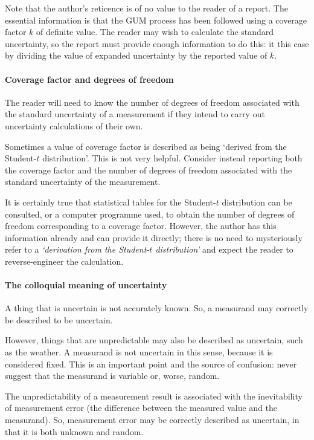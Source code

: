 Note that the author's reticence is of no value to the reader of a report. The essential information is that the GUM process has been followed using a coverage factor $k$ of definite value. The reader may wish to calculate the standard uncertainty, so the report must provide enough information to do this: it this case by dividing the value of expanded uncertainty by the reported value of $k$.

\paragraph{Coverage factor and degrees of freedom}
The reader will need to know the number of degrees of freedom associated with the standard uncertainty of a measurement if they intend to carry out uncertainty calculations of their own. 

Sometimes a value of coverage factor is described as being `derived from the Student-$t$ distribution'. This is not very helpful. Consider instead reporting both the coverage factor and the number of degrees of freedom associated with the standard uncertainty of the measurement.

It is certainly true that statistical tables for the Student-$t$ distribution can be consulted, or a computer programme used, to obtain the number of degrees of freedom corresponding to a coverage factor. However, the author has this information already and can provide it directly; there is no need to mysteriously refer to a \textit{`derivation from the Student-$t$ distribution'} and expect the reader to reverse-engineer the calculation. 

\paragraph{The colloquial meaning of uncertainty}
A thing that is uncertain is not accurately known. So, a measurand may correctly be described to be uncertain. 

However, things that are unpredictable may also be described as uncertain, such as the weather. A measurand is not uncertain in this sense, because it is considered fixed. This is an important point and the source of confusion: never suggest that the measurand is variable or, worse, random. 

The unpredictability of a measurement result is associated with the inevitability of measurement error (the difference between the measured value and the measurand). So, measurement error may be correctly described as uncertain, in that it is both unknown and random.

